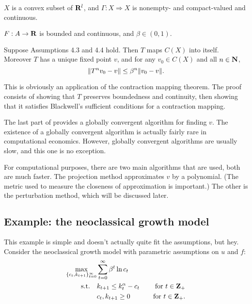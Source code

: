 \documentclass[11pt,letterpaper,reqno,oneside]{article}
\begin{document}
\begin{assumption}
	$X$ is a convex subset of $\mathbf{R}^l$, and $\Gamma : X \Rightarrow X$ is nonempty- and compact-valued and continuous.
\end{assumption}

\begin{assumption}
	$F : A \to \mathbf{R}$ is bounded and continuous, and $\beta \in (0,1)$.
\end{assumption}

\begin{theorem}[SLP Th'm 4.6]
	\label{theorem:4.6}
	Suppose Assumptions 4.3 and 4.4 hold. Then $T$ maps $C(X)$ into itself. Moreover $T$ has a unique fixed point $v$, and for any $v_0 \in C(X)$ and all $n \in \mathbf{N}$,
	\begin{equation*}
		\lVert T^n v_0 - v \rVert \leq \beta^n \lVert v_0 - v \rVert .
	\end{equation*}
\end{theorem}

This is obviously an application of the contraction mapping theorem. The proof consists of showing that $T$ preserves boundedness and continuity, then showing that it satisfies Blackwell's sufficient conditions for a contraction mapping.

The last part of  provides a globally convergent algorithm for finding $v$. The existence of a globally convergent algorithm is actually fairly rare in computational economics. However, globally convergent algorithms are usually slow, and this one is no exception.

For computational purposes, there are two main algorithms that are used, both are much faster. The projection method approximates $v$ by a polynomial. (The metric used to measure the closeness of approximation is important.) The other is the perturbation method, which will be discussed later.



\subsection{Example: the neoclassical growth model}
\label{sec:28Sep2015:example_neoclassical}

This example is simple and doesn't actually quite fit the assumptions, but hey. Consider the neoclassical growth model with parametric assumptions on $u$ and $f$:
%
\begin{align*}
	\max_{\{c_t,k_{t+1}\}_{t=0}^\infty} 
	& \sum_{t=0}^\infty \beta^t \ln c_t &
	\\
	\text{s.t.}\quad
	& k_{t+1} \leq k_t^\alpha - c_t & \quad\text{for $t \in \mathbf{Z}_+$}
	\\
	& c_t, k_{t+1} \geq 0 & \quad\text{for $t \in \mathbf{Z}_+$} .
	\nonumber
\end{align*}
\end{document}
